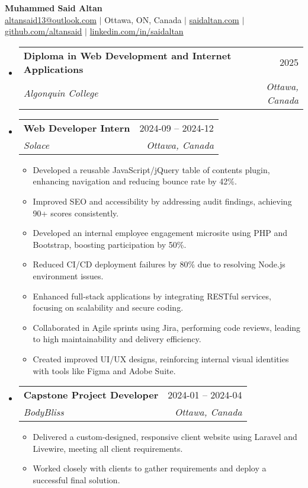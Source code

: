 \documentclass[letterpaper, 10pt]{article}
\makeatletter
\newcommand{\resumeItem}[1]{\item #1}
\newcommand{\resumeSubheading}[4]{
    \vspace{-1pt}\item
    \begin{tabular*}{0.97\textwidth}[t]{l@{\extracolsep{\fill}}r}
        \textbf{#1} & #2 \\
        \textit{\small#3} & \textit{\small #4} \\
    \end{tabular*}\vspace{-5pt}
}
\newcommand{\section}[2]{
    \vspace{10pt}\cvsection{#1}{#2}
}
\newcommand{\resumeSubHeadingListStart}{\begin{itemize}[leftmargin=0.15in, label={}]}
\newcommand{\resumeSubHeadingListEnd}{\end{itemize}}
\newcommand{\resumeItemListStart}{\begin{itemize}[leftmargin=0.5in, label={}]}
\newcommand{\resumeItemListEnd}{\end{itemize}\vspace{-5pt}}
\makeatother
\begin{document}
\begin{center}
    \textbf{{\sc Muhammed Said Altan}} \\
    \href{mailto:altansaid13@outlook.com}{altansaid13@outlook.com} $|$
    Ottawa, ON, Canada $|$
    \href{https://saidaltan.com}{saidaltan.com} $|$
    \href{https://github.com/altansaid}{github.com/altansaid} $|$
    \href{https://linkedin.com/in/saidaltan}{linkedin.com/in/saidaltan}
\end{center}

\section{Education}{}

\resumeSubHeadingListStart
\resumeSubheading
{Diploma in Web Development and Internet Applications}{2025}
{Algonquin College}{Ottawa, Canada}
\resumeSubHeadingListEnd

\section{Experience}{}

\resumeSubHeadingListStart
\resumeSubheading{Web Developer Intern}{2024-09 -- 2024-12}
{Solace}{Ottawa, Canada}
\resumeItemListStart
\resumeItem{Developed a reusable JavaScript/jQuery table of contents plugin, enhancing navigation and reducing bounce rate by 42\%.}
\resumeItem{Improved SEO and accessibility by addressing audit findings, achieving 90+ scores consistently.}
\resumeItem{Developed an internal employee engagement microsite using PHP and Bootstrap, boosting participation by 50\%.}
\resumeItem{Reduced CI/CD deployment failures by 80\% due to resolving Node.js environment issues.}
\resumeItem{Enhanced full-stack applications by integrating RESTful services, focusing on scalability and secure coding.}
\resumeItem{Collaborated in Agile sprints using Jira, performing code reviews, leading to high maintainability and delivery efficiency.}
\resumeItem{Created improved UI/UX designs, reinforcing internal visual identities with tools like Figma and Adobe Suite.}
\resumeItemListEnd
\resumeSubHeadingListEnd

\section{Leadership}{}

\resumeSubHeadingListStart
\resumeSubheading
{Capstone Project Developer}{2024-01 -- 2024-04}
{BodyBliss}{Ottawa, Canada}
\resumeItemListStart
\resumeItem{Delivered a custom-designed, responsive client website using Laravel and Livewire, meeting all client requirements.}
\resumeItem{Worked closely with clients to gather requirements and deploy a successful final solution.}
\resumeItemListEnd
\resumeSubHeadingListEnd
\end{document}
